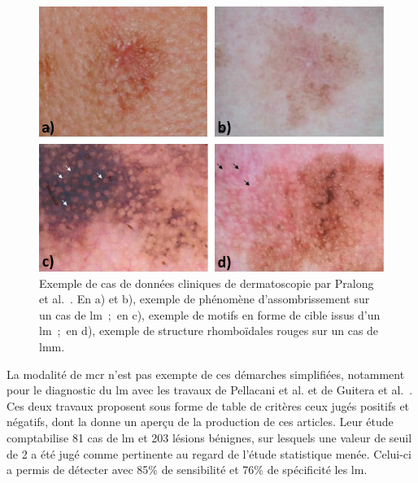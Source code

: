 \begin{figure}[H]
    \begin{center}
        \includegraphics[width=\linewidth]{contents/chapter_4/resources/example_dermoscopy_pattern.pdf}
        \caption{Exemple de cas de données cliniques de dermatoscopie par Pralong et al.~\cite{Pralong2012}. En a) et b), exemple de phénomène d'assombrissement sur un cas de \gls{lm}~;~en c), exemple de motifs en forme de cible issus d'un \gls{lm}~;~en d), exemple de structure rhomboïdales rouges sur un cas de \gls{lmm}.}
        \label{fig:example_dermoscopy_pattern}
    \end{center} 
\end{figure}\par

La modalité de \gls{mcr} n'est pas exempte de ces démarches simplifiées, notamment pour le diagnostic du \gls{lm} avec les travaux de Pellacani et al. et de Guitera et al.~\cite{Pellacani2007, Guitera2010}. Ces deux travaux proposent sous forme de table de critères ceux jugés positifs et négatifs, dont la  donne un aperçu de la production de ces articles. Leur étude comptabilise 81 cas de \gls{lm} et 203 lésions bénignes, sur lesquels une valeur de seuil de 2 a été jugé comme pertinente au regard de l'étude statistique menée. Celui-ci a permis de détecter avec 85\% de sensibilité et 76\% de spécificité les \gls{lm}.\par

